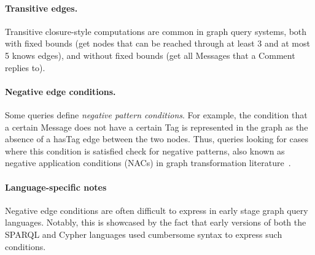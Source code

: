 \paragraph{Transitive edges.} Transitive closure-style computations are common in graph query systems, both with fixed bounds
(\eg get nodes that can be reached through at least 3 and at most 5 \textsf{knows} edges),
and without fixed bounds
(\eg get all \textsf{Messages} that a \textsf{Comment} replies to).

\paragraph{Negative edge conditions.} Some queries define \emph{negative pattern conditions}. For example, the condition that a certain \textsf{Message} does not have a certain \textsf{Tag} is represented in the graph as the absence of a \textsf{hasTag} edge between the two nodes. Thus, queries looking for cases where this condition is satisfied check for negative patterns, also known as negative application conditions (NACs) in graph transformation literature~\cite{DBLP:journals/fuin/HabelHT96}.

\paragraph{Language-specific notes}

Negative edge conditions are often difficult to express in early stage graph query languages. Notably, this is showcased by the fact that early versions of both the SPARQL and Cypher languages used cumbersome syntax to express such conditions.

